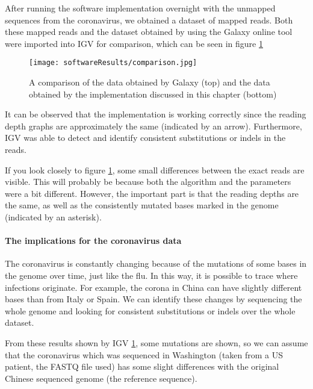 After running the software implementation overnight with the unmapped sequences from the coronavirus, we obtained a dataset of mapped reads. Both these mapped reads and the dataset obtained by using the Galaxy online tool were imported into IGV for comparison, which can be seen in figure \ref{fig:IGVcomparison}

\begin{figure}[H]
	\centering
	\texttt{[image: softwareResults/comparison.jpg]}
	\caption{A comparison of the data obtained by Galaxy (top) and the data obtained by the implementation discussed in this chapter (bottom)}
	\label{fig:IGVcomparison}
\end{figure}

It can be observed that the implementation is working correctly since the reading depth graphs are approximately the same (indicated by an arrow). Furthermore, IGV was able to detect and identify consistent substitutions or indels in the reads.

If you look closely to figure \ref{fig:IGVcomparison}, some small differences between the exact reads are visible. This will probably be because both the algorithm and the parameters were a bit different. However, the important part is that the reading depths are the same, as well as the consistently mutated bases marked in the genome (indicated by an asterisk).


\paragraph{The implications for the coronavirus data}
The coronavirus is constantly changing because of the mutations of some bases in the genome over time, just like the flu. In this way, it is possible to trace where infections originate. For example, the corona in China can have slightly different bases than from Italy or Spain. We can identify these changes by sequencing the whole genome and looking for consistent substitutions or indels over the whole dataset.

From these results shown by IGV \ref{fig:IGVcomparison}, some mutations are shown, so we can assume that the coronavirus which was sequenced in Washington (taken from a US patient, the FASTQ file used) has some slight differences with the original Chinese sequenced genome (the reference sequence).
